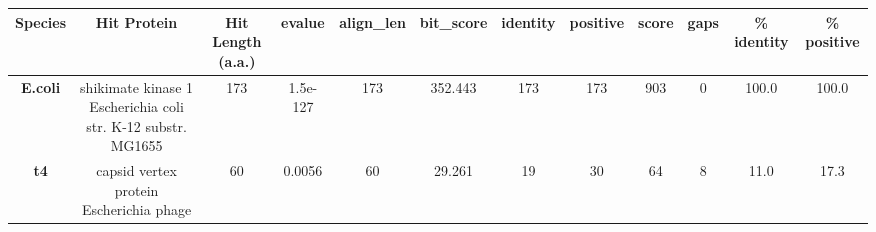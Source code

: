 \begin{tabular}{|c|c|c|c|c|c|c|c|c|c|c|c|} \hline
\textbf{Species} & \textbf{Hit Protein} & \textbf{Hit Length (a.a.)} & \textbf{evalue} & \textbf{align\_len} & \textbf{bit\_score} & \textbf{identity} & \textbf{positive} & \textbf{score} & \textbf{gaps} & \textbf{\% identity} & \textbf{\% positive} \\ \hline
\textbf{E.coli} & shikimate kinase 1 Escherichia coli str. K-12 substr. MG1655 & 173 & 1.5e-127 & 173 & 352.443 & 173 & 173 & 903 & 0 & 100.0 & 100.0\\
\textbf{t4} & capsid vertex protein Escherichia phage  & 60 & 0.0056 & 60 & 29.261 & 19 & 30 & 64 & 8 & 11.0 & 17.3\\
\hline \end{tabular}
